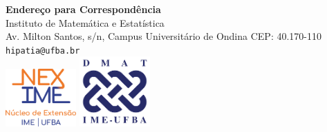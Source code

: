 \documentclass[onecolumn]{hipatia}
\begin{document}
\begin{center}
\vspace*{0.3cm}
\textbf{Endereço para Correspondência}\\
Instituto de Matemática e Estatística\\
Av. Milton Santos, s/n, Campus Universitário de Ondina CEP: 40.170-110\\
\texttt{hipatia@ufba.br}\\

  \includegraphics[width=2.7cm]{NEXIME.png}\hspace{2cm}
  \hspace{2cm}
  \includegraphics[width=2.7cm]{DMAT.png}


\end{center}
\newpage
\end{document}
